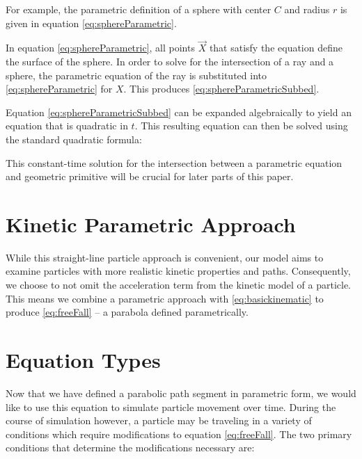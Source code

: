 For example, the parametric definition of a sphere with center $C$ and radius $r$ is given in equation \eqref{eq:sphereParametric}.

 {
	\label{eq:sphereParametric}
}

In equation \eqref{eq:sphereParametric}, all points $\vec{X}$ that satisfy the equation define the surface of the sphere. In order to solve for the intersection of a ray and a sphere, the parametric equation of the ray is substituted into \eqref{eq:sphereParametric} for $X$. This produces \eqref{eq:sphereParametricSubbed}.

 {
	\label{eq:sphereParametricSubbed}
}


Equation \eqref{eq:sphereParametricSubbed} can be expanded algebraically to yield an equation that is quadratic in $t$. This resulting equation can then be solved using the standard quadratic formula:

 {
	\label{eq:quadratic}
}

This constant-time solution for the intersection between a parametric equation and geometric primitive will be crucial for later parts of this paper.

\section{Kinetic Parametric Approach}

While this straight-line particle approach is convenient, our model aims to examine particles with more realistic kinetic properties and paths. Consequently, we choose to not omit the acceleration term from the kinetic model of a particle. This means we combine a parametric approach with \eqref{eq:basickinematic} to produce \eqref{eq:freeFall} -- a parabola defined parametrically.


\section{Equation Types}

Now that we have defined a parabolic path segment in parametric form, we would like to use this equation to simulate particle movement over time. During the course of simulation however, a particle may be traveling in a variety of conditions which require modifications to equation \eqref{eq:freeFall}. The two primary conditions that determine the modifications necessary are:

